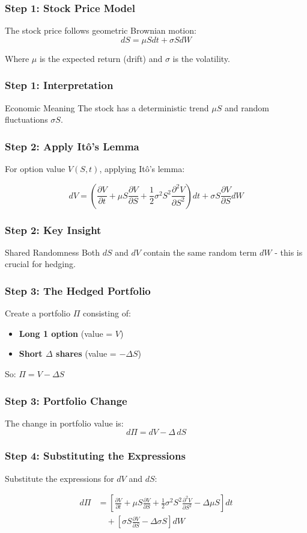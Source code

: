 \documentclass[aspectratio=169]{beamer}
\begin{document}
\begin{frame}
\frametitle{Step 1: Stock Price Model}
The stock price follows geometric Brownian motion:
\[dS = \mu S dt + \sigma S dW\]

Where \(\mu\) is the expected return (drift) and \(\sigma\) is the volatility.
\end{frame}

\begin{frame}
\frametitle{Step 1: Interpretation}
\begin{block}{Economic Meaning}
The stock has a deterministic trend \(\mu S\) and random fluctuations \(\sigma S\).
\end{block}
\end{frame}

\begin{frame}
\frametitle{Step 2: Apply Itô's Lemma}
For option value \(V(S,t)\), applying Itô's lemma:

\[dV = \left(\frac{\partial V}{\partial t} + \mu S \frac{\partial V}{\partial S} + \frac{1}{2}\sigma^2 S^2 \frac{\partial^2 V}{\partial S^2}\right) dt + \sigma S \frac{\partial V}{\partial S} dW\]
\end{frame}

\begin{frame}
\frametitle{Step 2: Key Insight}
\begin{block}{Shared Randomness}
Both \(dS\) and \(dV\) contain the same random term \(dW\) - this is crucial for hedging.
\end{block}
\end{frame}

\begin{frame}
\frametitle{Step 3: The Hedged Portfolio}
Create a portfolio \(\Pi\) consisting of:
\begin{itemize}
\item \textbf{Long 1 option} (value = \(V\))
\item \textbf{Short \(\Delta\) shares} (value = \(-\Delta S\))
\end{itemize}

So: \(\Pi = V - \Delta S\)
\end{frame}

\begin{frame}
\frametitle{Step 3: Portfolio Change}
The change in portfolio value is:
\[d\Pi = dV - \Delta \, dS\]
\end{frame}

\begin{frame}
\frametitle{Step 4: Substituting the Expressions}
Substitute the expressions for \(dV\) and \(dS\):

\begin{align}
d\Pi &= \left[\frac{\partial V}{\partial t} + \mu S \frac{\partial V}{\partial S} + \frac{1}{2}\sigma^2 S^2 \frac{\partial^2 V}{\partial S^2} - \Delta\mu S\right] dt \\
&\quad + \left[\sigma S \frac{\partial V}{\partial S} - \Delta\sigma S\right] dW
\end{align}
\end{frame}
\end{document}
